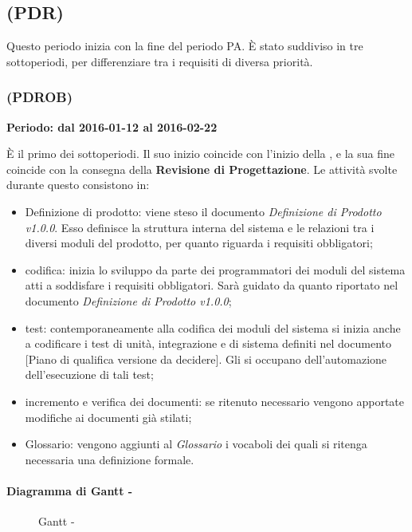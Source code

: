 \documentclass[./PianoDiProgetto.tex]{subfiles}
\begin{document}
  \subsection{\PerPDR[]{} (PDR)}

  Questo periodo inizia con la fine del periodo PA. È stato suddiviso in tre sottoperiodi, per differenziare tra i requisiti di diversa priorità.
  \subsubsection{\PerPDROB{} (PDROB)}
  \textbf{Periodo: dal 2016-01-12 al 2016-02-22}

  È il primo dei sottoperiodi. Il suo inizio coincide con l'inizio della \PerPDR[], e la sua fine coincide con la consegna della \textbf{Revisione di Progettazione}. Le attività svolte durante questo consistono in:
  \begin{itemize}
    \item Definizione di prodotto: viene steso il documento \textit{Definizione di Prodotto v1.0.0}. Esso definisce la struttura interna del sistema e le relazioni tra i diversi moduli del prodotto, per quanto riguarda i requisiti obbligatori;
    \item codifica: inizia lo sviluppo da parte dei programmatori dei moduli del sistema atti a soddisfare i requisiti obbligatori. Sarà guidato da quanto riportato nel documento \textit{Definizione di Prodotto v1.0.0};
    \item test: contemporaneamente alla codifica dei moduli del sistema si inizia anche a codificare i test di unità, integrazione e di sistema definiti nel documento [Piano di qualifica versione da decidere]. Gli \AMMP si occupano dell'automazione dell'esecuzione di tali test;
    \item incremento e verifica dei documenti: se ritenuto necessario vengono apportate modifiche ai documenti già stilati;
    \item Glossario: vengono aggiunti al \textit{Glossario} i vocaboli dei quali si ritenga necessaria una definizione formale.
  \end{itemize}

  \paragraph{Diagramma di Gantt - \PerPDROB}
    \begin{figure}[!h]
    \centering
    \caption{Gantt - \PerPDROB}
    \end{figure}
\end{document}
